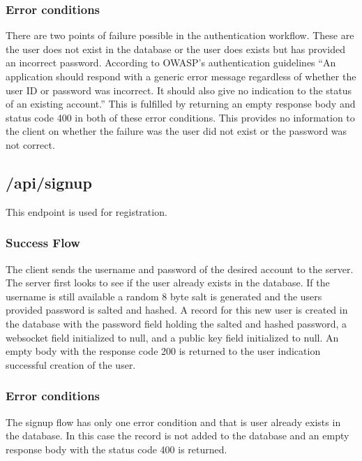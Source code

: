 \subsubsection{Error conditions}


There are two points of failure possible in the authentication workflow. These are the user does not exist in the database or the user does exists but has provided an incorrect password. According to OWASP’s authentication guidelines “An application should respond with a generic error message regardless of whether the user ID or password was incorrect. It should also give no indication to the status of an existing account.” \cite{owasp-auth} This is fulfilled by returning an empty response body and status code 400 in both of these error conditions. This provides no information to the client on whether the failure was the user did not exist or the password was not correct. 


\subsection{/api/signup}


This endpoint is used for registration.


\subsubsection{Success Flow}


The client sends the username and password of the desired account to the server. The server first looks to see if the user already exists in the database. If the username is still available a random 8 byte salt is generated and the users provided password is salted and hashed. A record for this new user is created in the database with the password field holding the salted and hashed password, a websocket field initialized to null, and a public key field initialized to null. An empty body with the response code 200 is returned to the user indication successful creation of the user.


\subsubsection{Error conditions}


The signup flow has only one error condition and that is user already exists in the database. In this case the record is not added to the database and an empty response body with the status code 400 is returned.


